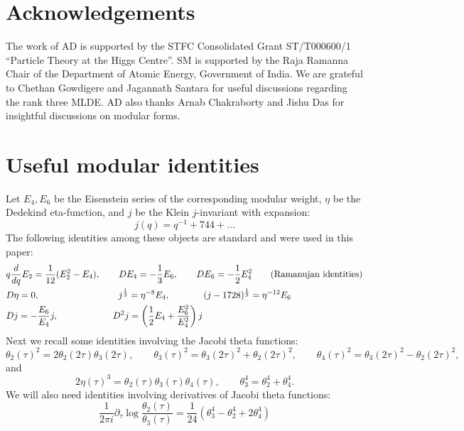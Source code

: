 \documentclass[11pt]{article}
\newcommand\half{\frac12}
\newcommand\be{\begin{equation}}
\newcommand\ee{\end{equation}}
\begin{document}
\section*{Acknowledgements}

The work of AD is supported by the STFC Consolidated Grant ST/T000600/1 ``Particle Theory at the Higgs Centre''. SM is supported by the Raja Ramanna Chair of the Department of Atomic Energy, Government of India. We are grateful to Chethan Gowdigere and Jagannath Santara for useful discussions regarding the rank three MLDE. AD also thanks Arnab Chakraborty and Jishu Das for insightful discussions on modular forms.

\appendix

\section{Useful modular identities}

Let $E_4,E_6$ be the Eisenstein series of the corresponding modular weight, $\eta$ be the Dedekind eta-function, and $j$ be the Klein $j$-invariant with expansion:
\be
j(q)=q^{-1}+744+\ldots
\ee
The following identities among these objects are standard and were used in this paper:
\be\label{j_ids}
\begin{split}
&q\frac{d}{dq} E_2 = \frac{1}{12}(E_2^2-E_4), \qquad DE_4 =-\frac13 E_6, \qquad DE_6 =-\half E_4^2 \qquad \hbox{(Ramanujan identities)}\\
& D\eta =0, \quad\quad\qquad\quad\qquad\quad \, \, \, \, j^\frac13 =\eta^{-8}E_4,  \quad\qquad \, \, \, \, (j-1728)^{\frac12} = \eta^{-12}E_6\\
& Dj =-\frac{E_6}{E_4}j, \quad\qquad\quad\qquad  D^2j = \left(\half E_4+\frac{E_6^2}{E_4^2}\right)j
\end{split}
\ee
 Next we recall some identities involving the Jacobi theta functions:
\begin{equation}
    \theta_2(\tau)^2
    =
    2\theta_2(2\tau)\theta_3(2\tau),
    \qquad
    \theta_3(\tau)^2
    =
    \theta_3(2\tau)^2+\theta_2(2\tau)^2,
    \qquad
    \theta_4(\tau)^2
    =
    \theta_3(2\tau)^2-\theta_2(2\tau)^2,
    \label{thetaPn_duplication}
\end{equation}
and
\begin{equation}
    2\eta(\tau)^3
    =
    \theta_2(\tau)\theta_3(\tau)\theta_4(\tau), \qquad \theta_3^4 = \theta_2^4 + \theta_4^4.
    \label{thetaPn_jacobi}
\end{equation}
We will also need identities involving derivatives of Jacobi theta functions:
\be\label{eq:theta_derive}
    \frac{1}{2\pi i}\partial_\tau\log\frac{\theta_2(\tau)}{\theta_3(\tau)} = \frac{1}{24}(\theta_3^4 - \theta_2^4 + 2\theta_4^4)
\ee
\end{document}
